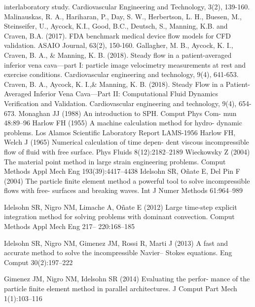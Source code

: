 interlaboratory study. Cardiovascular Engineering and Technology, 3(2), 139-160.
 Malinauskas, R. A., Hariharan, P., Day, S. W., Herbertson, L. H., Buesen, M., Steinseifer, U., Aycock, K.I., Good, B.C., Deutsch,
S., Manning, K.B. and Craven, B.A. (2017). FDA benchmark medical device flow models for CFD validation. ASAIO Journal,
63(2), 150-160.
 Gallagher, M. B., Aycock, K. I., Craven, B. A., \& Manning, K. B. (2018). Steady flow in a patient-averaged inferior vena cava—part I: particle image velocimetry measurements at rest and exercise conditions. Cardiovascular engineering and technology, 9(4), 641-653.
 Craven, B. A., Aycock, K. I.,\& Manning, K. B. (2018). Steady Flow in a Patient-Averaged Inferior Vena Cava—Part II: Computational Fluid Dynamics Verification and Validation. Cardiovascular engineering and technology, 9(4), 654-673.
 Monaghan JJ (1988) An introduction to SPH. Comput Phys Com-
mun 48:89–96
 Harlow FH (1955) A machine calculation method for hydro-
dynamic problems. Los Alamos Scientific Laboratory Report
LAMS-1956
 Harlow FH, Welch J (1965) Numerical calculation of time depen-
dent viscous incompressible flow of fluid with free surface. Phys
Fluids 8(12):2182–2189
 Wieckowsky Z (2004) The material point method in large
strain engineering problems. Comput Methods Appl Mech Eng
193(39):4417–4438
 Idelsohn SR, Oñate E, Del Pin F (2004) The particle finite element
method a powerful tool to solve incompressible flows with free-
surfaces and breaking waves. Int J Numer Methods 61:964–989

 Idelsohn SR, Nigro NM, Limache A, Oñate E (2012) Large
time-step explicit integration method for solving problems with
dominant convection. Comput Methods Appl Mech Eng 217–
220:168–185

 Idelsohn SR, Nigro NM, Gimenez JM, Rossi R, Marti J (2013)
A fast and accurate method to solve the incompressible Navier–
Stokes equations. Eng Comput 30(2):197–222

 Gimenez JM, Nigro NM, Idelsohn SR (2014) Evaluating the perfor-
mance of the particle finite element method in parallel architectures.
J Comput Part Mech 1(1):103–116

